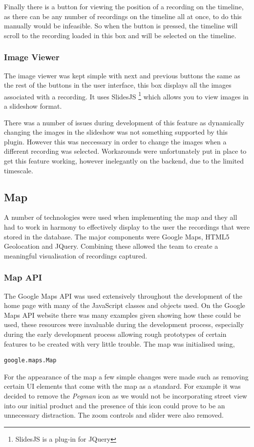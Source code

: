 \documentclass{l3proj}
\begin{document}
Finally there is a button for viewing the position of a recording on the timeline, as there can be any number of recordings on the timeline all at once, to do this manually would be infeasible. So when the button is pressed, the timeline will scroll to the recording loaded in this box and will be selected on the timeline.

\subsubsection{Image Viewer}		The image viewer was kept simple with next and previous buttons the same as the rest of the buttons in the user interface, this box displays all the images associated with a recording. It uses SlidesJS \footnote{SlidesJS is a plug-in for JQuery} which  allows you to view images in a slideshow format.

There was a number of issues during development of this feature as dynamically changing the images in the slideshow was not something supported by this plugin. However this was neccessary in order to change the images when a different recording was selected. Workarounds were unfortunately put in place to get this feature working, however inelegantly on the backend, due to the limited timescale.

\subsection{Map}		A number of technologies were used when implementing the map and they all had to work in harmony to effectively display to the user the recordings that were stored in the database. The major components were Google Maps, HTML5 Geolocation and \gls{JQuery}. Combining these allowed the team to create a meaningful visualisation of recordings captured.

\subsubsection{Map API}		The Google Maps \gls{API} was used extensively throughout the development of the home page with many of the \gls{JavaScript} classes and objects used. On the Google Maps API website there was many examples given showing how these could be used, these resources were invaluable during the development process, especially during the early development process allowing rough prototypes of certain features to be created with very little trouble. The map was initialised using,
\begin{verbatim}
google.maps.Map
\end{verbatim}
For the appearance of the map a few simple changes were made such as removing certain UI elements that come with the map as a standard. For example it was decided to remove the \textit{Pegman} icon as we would not be incorporating street view into our initial product and the presence of this icon could prove to be an unnecessary distraction. The zoom controls and slider were also removed.
\end{document}
